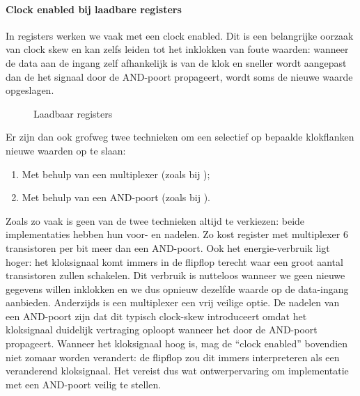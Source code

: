 \paragraph{Clock enabled bij laadbare registers}
In registers werken we vaak met een clock enabled. Dit is een belangrijke oorzaak van clock skew en kan zelfs leiden tot het inklokken van foute waarden: wanneer de data aan de ingang zelf afhankelijk is van de klok en sneller wordt aangepast dan de het signaal door de AND-poort propageert, wordt soms de nieuwe waarde opgeslagen.
\begin{figure}[hbt]
\centering
{}
\caption{Laadbaar registers}
\end{figure}
Er zijn dan ook grofweg twee technieken om een selectief op bepaalde klokflanken nieuwe waarden op te slaan:
\begin{enumerate}
 \item Met behulp van een multiplexer (zoals bij );
 \item Met behulp van een AND-poort (zoals bij ).
\end{enumerate}
Zoals zo vaak is geen van de twee technieken altijd te verkiezen: beide implementaties hebben hun voor- en nadelen. Zo kost register met multiplexer $6$ transistoren per bit meer dan een AND-poort. Ook het energie-verbruik ligt hoger: het kloksignaal komt immers in de flipflop terecht waar een groot aantal transistoren zullen schakelen. Dit verbruik is nutteloos wanneer we geen nieuwe gegevens willen inklokken en we dus opnieuw dezelfde waarde op de data-ingang aanbieden. Anderzijds is een multiplexer een vrij veilige optie. De nadelen van een AND-poort zijn dat dit typisch clock-skew introduceert omdat het kloksignaal duidelijk vertraging oploopt wanneer het door de AND-poort propageert. Wanneer het kloksignaal hoog is, mag de ``clock enabled'' bovendien niet zomaar worden verandert: de flipflop zou dit immers interpreteren als een veranderend kloksignaal. Het vereist dus wat ontwerpervaring om implementatie met een AND-poort veilig te stellen.
